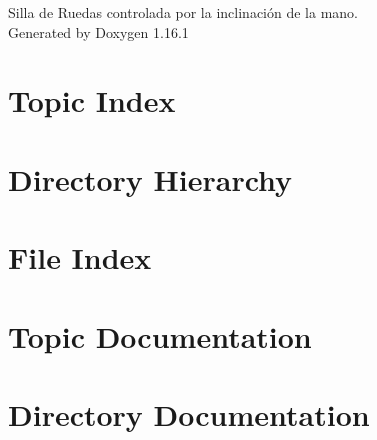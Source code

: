 \documentclass[twoside]{book}
\newcommand{\+}{\discretionary{\mbox{\scriptsize$\hookleftarrow$}}{}{}}
\newcommand{\clearemptydoublepage}{%
    \newpage{\pagestyle{empty}\cleardoublepage}%
  }
\begin{document}
  \raggedbottom
    \hypersetup{pageanchor=false,
                bookmarksnumbered=true,
                pdfencoding=unicode
               }
  \begin{titlepage}
  \vspace*{7cm}
  \begin{center}%
  {\Large Silla de Ruedas controlada por la inclinación de la mano.}\\
  \vspace*{1cm}
  {\large Generated by Doxygen 1.16.1}\\
  \end{center}
  \end{titlepage}
  \clearemptydoublepage
  \tableofcontents
  \clearemptydoublepage
  \hypersetup{pageanchor=true}
\chapter{Topic Index}

\chapter{Directory Hierarchy}

\chapter{File Index}

\chapter{Topic Documentation}

\chapter{Directory Documentation}
















\end{document}
